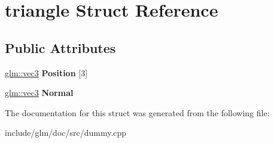 \hypertarget{structtriangle}{\section{triangle \-Struct \-Reference}
\label{structtriangle}
}
\subsection*{\-Public \-Attributes}
\begin{DoxyCompactItemize}
\item 
\hypertarget{structtriangle_ac4e35120524cb184eb69e87f08fb08a9}{\hyperlink{group__core__types_gad45787527c6ff2bd6680867204eb0354}{glm\-::vec3} {\bfseries \-Position} \mbox{[}3\mbox{]}}\label{structtriangle_ac4e35120524cb184eb69e87f08fb08a9}

\item 
\hypertarget{structtriangle_aa8daebaae02ffdd161480a5641fbc8af}{\hyperlink{group__core__types_gad45787527c6ff2bd6680867204eb0354}{glm\-::vec3} {\bfseries \-Normal}}\label{structtriangle_aa8daebaae02ffdd161480a5641fbc8af}

\end{DoxyCompactItemize}


\-The documentation for this struct was generated from the following file\-:\begin{DoxyCompactItemize}
\item 
include/glm/doc/src/dummy.\-cpp\end{DoxyCompactItemize}
